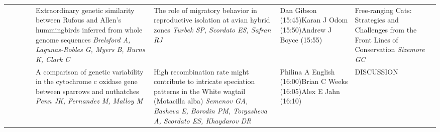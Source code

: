 \begin{tabular}{|x{0.85cm}|x{2.85cm}|x{2.85cm}|x{2.85cm}|x{2.85cm}|a{2.85cm}|a{2.85cm}|a{2.85cm}|}
& \newline \newline \textit{} &  \newline \newline \textit{} &  \newline \newline \textit{} & Extraordinary genetic similarity between Rufous and Allen's hummingbirds inferred from whole genome sequences \newline \newline \textit{Brelsford A, Lagunas-Robles G, Myers B, Burns K, Clark C} & The role of migratory behavior in reproductive isolation at avian hybrid zones \newline \newline \textit{Turbek SP, Scordato ES, Safran RJ} & Dan  Gibson (15:45)\newline \newline \newline Karan J Odom (15:50)\newline \newline \newline Andrew J Boyce (15:55) \newline \newline \textit{} & Free-ranging Cats: Strategies and Challenges from the Front Lines of Conservation \newline \newline \textit{Sizemore GC}\\
& \newline \newline \textit{} &  \newline \newline \textit{} &  \newline \newline \textit{} & A comparison of genetic variability in the cytochrome c oxidase gene between sparrows and nuthatches \newline \newline \textit{Penn JK, Fernandez M, Malloy M} & High recombination rate might contribute to intricate speciation patterns in the White wagtail (Motacilla alba) \newline \newline \textit{Semenov GA, Basheva E, Borodin PM, Torgasheva A, Scordato ES, Khaydarov DR} & Philina A English (16:00)\newline \newline \newline Brian C Weeks (16:05)\newline \newline \newline Alex E Jahn (16:10) \newline \newline \textit{} & DISCUSSION \newline \newline \textit{}\\

\end{tabular}
